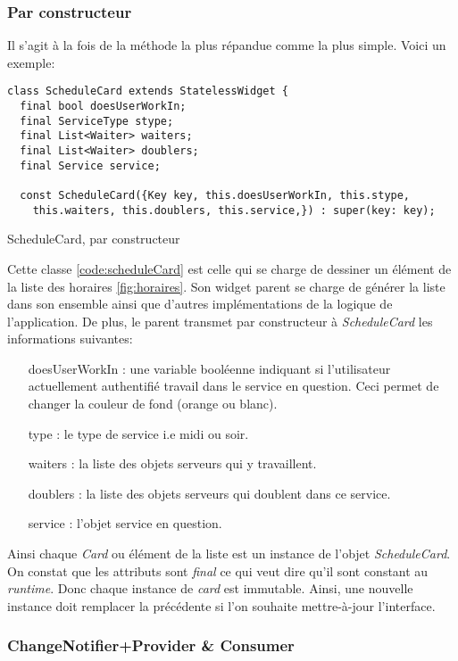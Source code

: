 \subsubsection{Par constructeur}
Il s'agit à la fois de la méthode la plus répandue comme la plus simple. Voici un exemple:

\begin{listing}[h]
    \begin{verbatim}
class ScheduleCard extends StatelessWidget {
  final bool doesUserWorkIn;
  final ServiceType stype;
  final List<Waiter> waiters;
  final List<Waiter> doublers;
  final Service service;
  
  const ScheduleCard({Key key, this.doesUserWorkIn, this.stype,
    this.waiters, this.doublers, this.service,}) : super(key: key);
    \end{verbatim}
    \caption{ScheduleCard, par constructeur}
    \label{code:scheduleCard}
\end{listing}
Cette classe \ref{code:scheduleCard} est celle qui se charge de dessiner un élément de la liste des horaires \ref{fig:horaires}. Son widget parent se charge de générer la liste dans son ensemble ainsi que d'autres implémentations de la logique de l'application. De plus, le parent transmet par constructeur à \textit{ScheduleCard} les informations suivantes:
\smallskip
\begin{itemize}
    \item [doesUserWorkIn] : une variable booléenne indiquant si l'utilisateur actuellement authentifié travail dans le service en question. Ceci permet de changer la couleur de fond (orange ou blanc).
    \item [type] : le type de service i.e midi ou soir.
    \item [waiters]: la liste des objets serveurs qui y travaillent.
    \item [doublers]: la liste des objets serveurs qui doublent dans ce service.
    \item [service]: l'objet service en question.
\end{itemize}
\smallskip

Ainsi chaque \textit{Card} ou élément de la liste est un instance de l'objet \textit{ScheduleCard}. On constat que les attributs sont \textit{final} ce qui veut dire qu'il sont constant au \textit{runtime}. Donc chaque instance de \textit{card} est immutable. Ainsi, une nouvelle instance doit remplacer la précédente si l'on souhaite mettre-à-jour l'interface. 

\subsubsection{ChangeNotifier+Provider \& Consumer}

